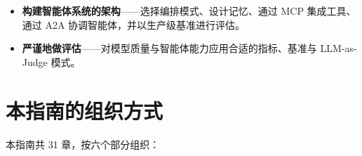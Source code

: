 \documentclass[11pt,a4paper,openany]{book}
\begin{document}
\begin{itemize}
  \item \textbf{构建智能体系统的架构}——选择编排模式、设计记忆、通过 MCP 集成工具、通过 A2A 协调智能体，并以生产级基准进行评估。
  \item \textbf{严谨地做评估}——对模型质量与智能体能力应用合适的指标、基准与 LLM-as-Judge 模式。
\end{itemize}

\section*{本指南的组织方式}
\label{how-this-guide-is-organized}

本指南共 31 章，按六个部分组织：
\end{document}
